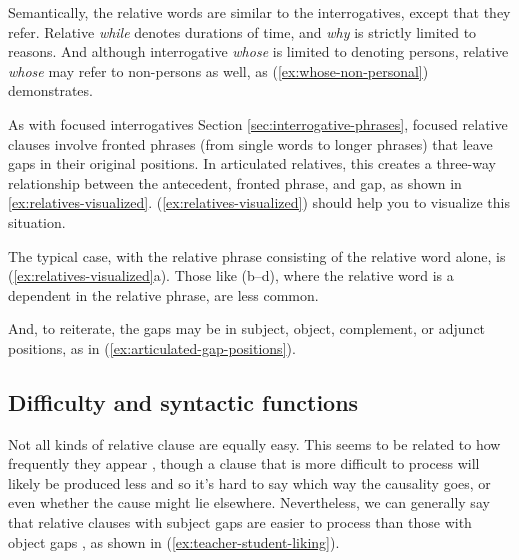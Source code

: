 Semantically, the relative words are similar to the interrogatives, except that they refer. Relative \textit{while} denotes durations of time, and \textit{why} is strictly limited to reasons. And although interrogative \textit{whose} is limited to denoting persons, relative \textit{whose} may refer to non-persons as well, as (\ref{ex:whose-non-personal}) demonstrates.

\begin{samepage}
    \ea\label{ex:whose-non-personal}
        \z
    \z
\end{samepage}

As with focused interrogatives Section \ref{sec:interrogative-phrases}, focused relative clauses involve fronted phrases (from single words to longer phrases) that leave gaps in their original positions. In articulated relatives, this creates a three-way relationship between the antecedent, fronted phrase, and gap, as shown in \ref{ex:relatives-visualized}.  (\ref{ex:relatives-visualized}) should help you to visualize this situation.

The typical case, with the relative phrase consisting of the relative word alone, is (\ref{ex:relatives-visualized}a). Those like (b--d), where the relative word is a dependent in the relative phrase, are less common.

And, to reiterate, the gaps may be in subject, object, complement, or adjunct positions, as in (\ref{ex:articulated-gap-positions}).

\subsection{Difficulty and syntactic functions} \label{sec:difficulty-relatives}

Not all kinds of relative clause are equally easy. This seems to be related to how frequently they appear \citep{Reali2007}, though a clause that is more difficult to process will likely be produced less and so it's hard to say which way the causality goes, or even whether the cause might lie elsewhere. Nevertheless, we can generally say that relative clauses with subject gaps are easier to process than those with object gaps \citep{Lau2021}, as shown in (\ref{ex:teacher-student-liking}).

